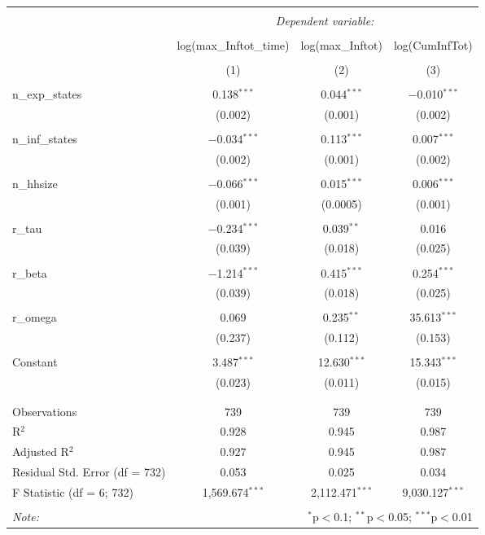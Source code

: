 
\begin{table}[!htbp] \centering 
  \caption{} 
  \label{} 
\begin{tabular}{@{\extracolsep{5pt}}lccc} 
\\[-1.8ex]\hline 
\hline \\[-1.8ex] 
 & \multicolumn{3}{c}{\textit{Dependent variable:}} \\ 
\cline{2-4} 
\\[-1.8ex] & log(max\_Inftot\_time) & log(max\_Inftot) & log(CumInfTot) \\ 
\\[-1.8ex] & (1) & (2) & (3)\\ 
\hline \\[-1.8ex] 
 n\_exp\_states & 0.138$^{***}$ & 0.044$^{***}$ & $-$0.010$^{***}$ \\ 
  & (0.002) & (0.001) & (0.002) \\ 
  & & & \\ 
 n\_inf\_states & $-$0.034$^{***}$ & 0.113$^{***}$ & 0.007$^{***}$ \\ 
  & (0.002) & (0.001) & (0.002) \\ 
  & & & \\ 
 n\_hhsize & $-$0.066$^{***}$ & 0.015$^{***}$ & 0.006$^{***}$ \\ 
  & (0.001) & (0.0005) & (0.001) \\ 
  & & & \\ 
 r\_tau & $-$0.234$^{***}$ & 0.039$^{**}$ & 0.016 \\ 
  & (0.039) & (0.018) & (0.025) \\ 
  & & & \\ 
 r\_beta & $-$1.214$^{***}$ & 0.415$^{***}$ & 0.254$^{***}$ \\ 
  & (0.039) & (0.018) & (0.025) \\ 
  & & & \\ 
 r\_omega & 0.069 & 0.235$^{**}$ & 35.613$^{***}$ \\ 
  & (0.237) & (0.112) & (0.153) \\ 
  & & & \\ 
 Constant & 3.487$^{***}$ & 12.630$^{***}$ & 15.343$^{***}$ \\ 
  & (0.023) & (0.011) & (0.015) \\ 
  & & & \\ 
\hline \\[-1.8ex] 
Observations & 739 & 739 & 739 \\ 
R$^{2}$ & 0.928 & 0.945 & 0.987 \\ 
Adjusted R$^{2}$ & 0.927 & 0.945 & 0.987 \\ 
Residual Std. Error (df = 732) & 0.053 & 0.025 & 0.034 \\ 
F Statistic (df = 6; 732) & 1,569.674$^{***}$ & 2,112.471$^{***}$ & 9,030.127$^{***}$ \\ 
\hline 
\hline \\[-1.8ex] 
\textit{Note:}  & \multicolumn{3}{r}{$^{*}$p$<$0.1; $^{**}$p$<$0.05; $^{***}$p$<$0.01} \\ 
\end{tabular} 
\end{table} 
